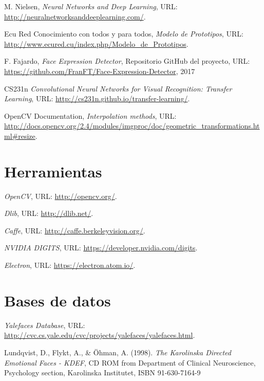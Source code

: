 \documentclass[a4paper,11pt]{book}
\begin{document}
\begin{thebibliography}{99}
	M. Nielsen,   
	\textit{Neural Networks and Deep Learning}, 
	URL: \url{http://neuralnetworksanddeeplearning.com/}.
	
	Ecu Red Conocimiento con todos y para todos,   
	\textit{Modelo de Prototipos}, 
	URL: \url{http://www.ecured.cu/index.php/Modelo_de_Prototipos}.
	
	F. Fajardo,   
	\textit{Face Expression Detector}, 
	Repositorio GitHub del proyecto, 
	URL: \url{https://github.com/FranFT/Face-Expression-Detector}, 
	2017
	
	CS231n  
	\textit{Convolutional Neural Networks for Visual Recognition: Transfer Learning}, 
	URL: \url{http://cs231n.github.io/transfer-learning/}.
	
	OpenCV Documentation,  
	\textit{Interpolation methods}, 
	URL: \url{	http://docs.opencv.org/2.4/modules/imgproc/doc/geometric_transformations.html#resize}.

	
	
	\section{Herramientas}
	\textit{OpenCV}, 
	URL: \url{http://opencv.org/}.
	
	\textit{Dlib}, 
	URL: \url{http://dlib.net/}.
	
	\textit{Caffe}, 
	URL: \url{http://caffe.berkeleyvision.org/}.
	
	\textit{NVIDIA DIGITS}, 
	URL: \url{https://developer.nvidia.com/digits}.
	
	\textit{Electron}, 
	URL: \url{https://electron.atom.io/}.
	
	\section{Bases de datos}
	\textit{Yalefaces Database}, 
	URL: \url{	http://cvc.cs.yale.edu/cvc/projects/yalefaces/yalefaces.html}.
	
	Lundqvist, D., Flykt, A., \& Öhman, A. (1998). %
	\textit{The Karolinska Directed Emotional Faces - KDEF}, %
	CD ROM from Department of Clinical Neuroscience, Psychology section, Karolinska Institutet, ISBN 91-630-7164-9
	
	

	
\end{thebibliography}
\end{document}
